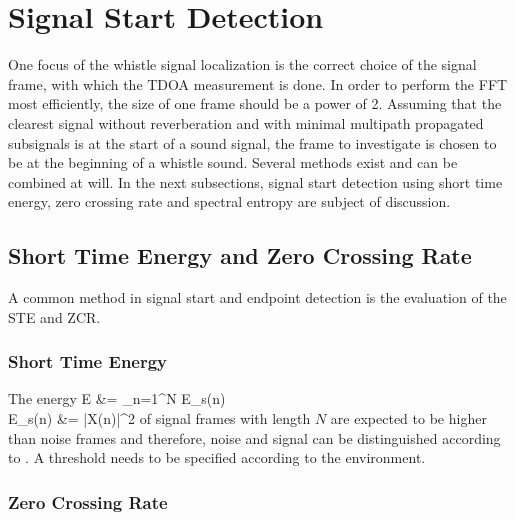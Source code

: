 \section{Signal Start Detection}
\label{sec:02_signalStartDetection}

One focus of the whistle signal localization is the correct choice of the
signal frame, with which the \ac{TDOA} measurement is done.
In order to perform the \ac{FFT} most efficiently, the size of one frame
should be a power of 2.
Assuming that the clearest signal without reverberation and with minimal
multipath propagated subsignals is at the start of a sound signal,
the frame to investigate is chosen to be at the beginning of a whistle sound.
Several methods exist and can be combined at will.
In the next subsections, signal start detection using short time energy,
zero crossing rate and spectral entropy are subject of discussion.

\subsection{Short Time Energy and Zero Crossing Rate}

A common method in signal start and endpoint detection is the evaluation
of the \ac{STE} and \ac{ZCR}.

\subsubsection{Short Time Energy}
The energy
\bal
    E &= \sum_{n=1}^N E_s(n)\\
    \label{eq:02_energy}
    E_s(n) &= |X(n)|^2
    \label{eq:02_spectralEnergy}
\eal
of signal frames with length $N$ are expected to be higher than noise frames
and therefore, noise and signal can be distinguished
according to \cite{Z_W_voiceActivity}.
A threshold needs to be specified according to the environment.

\subsubsection{Zero Crossing Rate}

